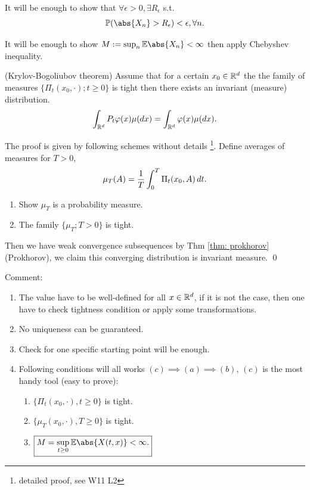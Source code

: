 \begin{cor}
It will be enough to show that $\forall \epsilon >0, \exists R_\epsilon$ s.t.
\begin{equation*}
    \prob(\abs{X_n} > R_\epsilon) < \epsilon, \forall n.
\end{equation*}
\end{cor}
\begin{cor}
It will be enough to show $M := \sup_n \E\abs{X_n} < \infty$ then apply Chebyshev inequality.
\end{cor}
\begin{thm}{(Krylov-Bogoliubov theorem)}
Assume that for a certain $x_0 \in \mathbb{R}^d$ the the family of measures 
$\{\Pi_t(x_0, \cdot); t\geq 0\}$ is tight then there exists an invariant (measure) distribution.
\begin{equation*}
    \int_{\mathbb{R}^d} P_t\varphi(x) \mu(\mathop{}\!d x) = \int_{\mathbb{R}^d} \varphi(x) \mu(\mathop{}\!d  x).
\end{equation*}
\end{thm}
\pf The proof is given by following schemes without details \footnote{detailed proof, see W11 L2}. Define averages of measures for $T >0$,
\begin{equation*}
    \mu_T(A) = \frac{1}{T}\int_0^T \Pi_t(x_0, A) \mathop{}\!d t.
\end{equation*}
\begin{enumerate}
    \item Show $\mu_T$ is a probability measure.
    \item The family $\{\mu_T ; T >0\}$ is tight.
\end{enumerate}
Then we have weak convergence subsequences by Thm \ref{thm: prokhorov} (Prokhorov), we claim this converging distribution is invariant measure. \qed

Comment: 
\begin{enumerate}
    \item The value have to be well-defined for all $x\in\mathbb{R}^d$, if it is not the case, then one have to check tightness condition or apply some transformations.
    \item No uniqueness can be guaranteed.
    \item Check for one specific starting point will be enough.
    \item Following conditions will all works $(c) \implies (a) \implies (b)$, $(c)$ is the most handy tool (easy to prove):
    \begin{enumerate}
        \item $\{\Pi_t(x_0, \cdot), t\geq 0\}$ is tight.
        \item $\{\mu_T(x_0, \cdot), T\geq 0\}$ is tight.
        \item $\boxed{M = \sup_{t \geq 0} \E\abs{X(t,x)} < \infty.}$
    \end{enumerate}
\end{enumerate}

